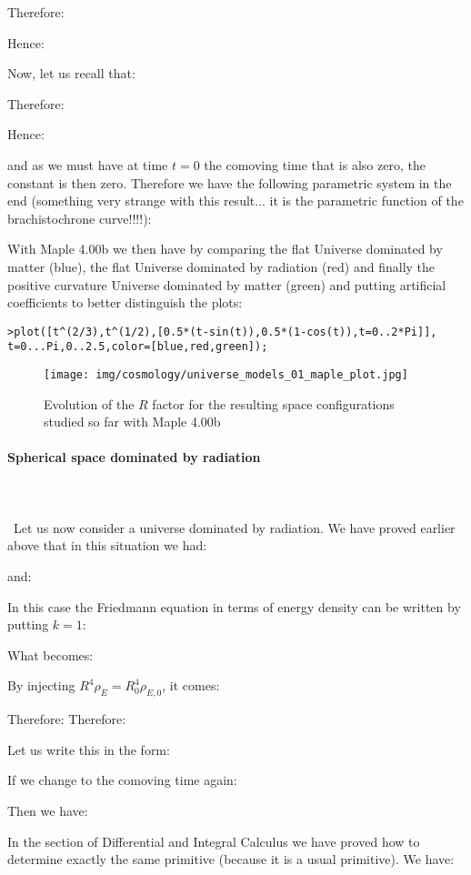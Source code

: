 	Therefore:
	
	Hence:
	
	Now, let us recall that:
	
	Therefore:
	
	Hence:
	
	and as we must have at time $t=0$ the comoving time that is also zero, the constant is then zero. Therefore we have the following parametric system in the end (something very strange with this result... it is the parametric function of the brachistochrone curve!!!!):
	
	With Maple 4.00b we then have by comparing the flat Universe dominated by matter (blue), the flat Universe dominated by radiation (red) and finally the positive curvature Universe dominated by matter (green) and putting artificial coefficients to better distinguish the plots:
	
	\texttt{>plot([t\string^(2/3),t\string^(1/2),[0.5*(t-sin(t)),0.5*(1-cos(t)),t=0..2*Pi]],\\
	t=0...Pi,0..2.5,color=[blue,red,green]);}
	\begin{figure}[H]
		\centering
		\texttt{[image: img/cosmology/universe\_models\_01\_maple\_plot.jpg]}
		\caption[]{Evolution of the $R$ factor for the resulting space configurations studied so far with Maple 4.00b}
	\end{figure}
	
	\paragraph{Spherical space dominated by radiation}\mbox{}\\\\\
	Let us now consider a universe dominated by radiation. We have proved earlier above that in this situation we had:
	
	and:
	
	In this case the Friedmann equation in terms of energy density can be written by putting $k=1$:
	
	What becomes:
	
	By injecting $R^4\rho_E=R_0^4\rho_{E,0}$, it comes:
	
	Therefore:
	Therefore:
	
	Let us write this in the form:
		
	If we change to the comoving time again:
	
	Then we have:
		
	In the section of Differential and Integral Calculus we have proved how to determine exactly the same primitive (because it is a usual primitive). We have:
	
